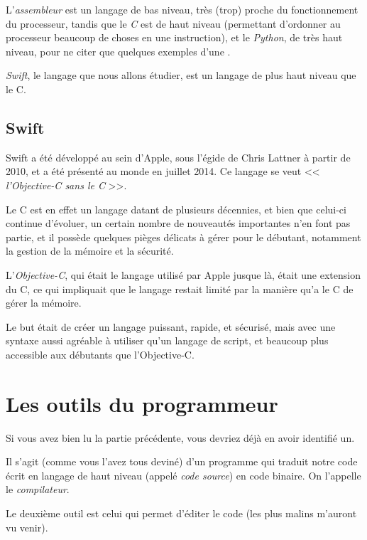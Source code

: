 
L'\emph{assembleur} est un langage de bas niveau,
très (trop) proche du fonctionnement du processeur,
tandis que le \emph{C} est de haut niveau
(permettant d'ordonner au processeur beaucoup de choses en une instruction),
et le \emph{Python}, de très haut niveau,
pour ne citer que quelques exemples d'une 
.

\emph{Swift}, le langage que nous allons étudier, est un langage de plus haut niveau
que le C.
\subsection{Swift}
Swift a été développé au sein d'Apple, sous l'égide de Chris Lattner à partir de 2010, et a
été présenté au monde en juillet 2014. Ce langage se veut << \emph{l'Objective-C sans le C} >>.

Le C est en effet un langage datant de plusieurs décennies,
et bien que celui-ci continue d'évoluer,
un certain nombre de nouveautés importantes n'en font pas partie,
et il possède quelques pièges délicats à gérer pour le débutant,
notamment la gestion de la mémoire et la sécurité.

L'\emph{Objective-C}, qui était le langage utilisé par Apple jusque là,
était une extension du C, ce qui impliquait que le langage restait limité
par la manière qu'a le C de gérer la mémoire.

Le but était de créer un langage puissant, rapide, et sécurisé, mais avec une syntaxe
aussi agréable à utiliser qu’un langage de script,
et beaucoup plus accessible aux débutants que l'Objective-C.
\section{Les outils du programmeur}
Si vous avez bien lu la partie précédente, vous devriez déjà en avoir identifié un.

Il s'agit (comme vous l'avez tous deviné) d'un programme
qui traduit notre code écrit en langage de haut niveau (appelé \emph{code source}) en code binaire.
On l'appelle le \emph{compilateur}.

%

Le deuxième outil est celui qui permet d'éditer le code (les plus malins m'auront vu venir).

